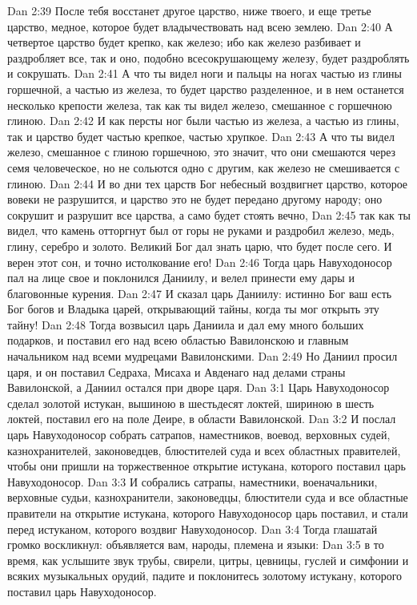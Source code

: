 Dan 2:39  После тебя восстанет другое царство, ниже твоего, и еще третье царство, медное, которое будет владычествовать над всею землею.
Dan 2:40  А четвертое царство будет крепко, как железо; ибо как железо разбивает и раздробляет все, так и оно, подобно всесокрушающему железу, будет раздроблять и сокрушать.
Dan 2:41  А что ты видел ноги и пальцы на ногах частью из глины горшечной, а частью из железа, то будет царство разделенное, и в нем останется несколько крепости железа, так как ты видел железо, смешанное с горшечною глиною.
Dan 2:42  И как персты ног были частью из железа, а частью из глины, так и царство будет частью крепкое, частью хрупкое.
Dan 2:43  А что ты видел железо, смешанное с глиною горшечною, это значит, что они смешаются через семя человеческое, но не сольются одно с другим, как железо не смешивается с глиною.
Dan 2:44  И во дни тех царств Бог небесный воздвигнет царство, которое вовеки не разрушится, и царство это не будет передано другому народу; оно сокрушит и разрушит все царства, а само будет стоять вечно,
Dan 2:45  так как ты видел, что камень отторгнут был от горы не руками и раздробил железо, медь, глину, серебро и золото. Великий Бог дал знать царю, что будет после сего. И верен этот сон, и точно истолкование его!
Dan 2:46  Тогда царь Навуходоносор пал на лице свое и поклонился Даниилу, и велел принести ему дары и благовонные курения.
Dan 2:47  И сказал царь Даниилу: истинно Бог ваш есть Бог богов и Владыка царей, открывающий тайны, когда ты мог открыть эту тайну!
Dan 2:48  Тогда возвысил царь Даниила и дал ему много больших подарков, и поставил его над всею областью Вавилонскою и главным начальником над всеми мудрецами Вавилонскими.
Dan 2:49  Но Даниил просил царя, и он поставил Седраха, Мисаха и Авденаго над делами страны Вавилонской, а Даниил остался при дворе царя.
Dan 3:1  Царь Навуходоносор сделал золотой истукан, вышиною в шестьдесят локтей, шириною в шесть локтей, поставил его на поле Деире, в области Вавилонской.
Dan 3:2  И послал царь Навуходоносор собрать сатрапов, наместников, воевод, верховных судей, казнохранителей, законоведцев, блюстителей суда и всех областных правителей, чтобы они пришли на торжественное открытие истукана, которого поставил царь Навуходоносор.
Dan 3:3  И собрались сатрапы, наместники, военачальники, верховные судьи, казнохранители, законоведцы, блюстители суда и все областные правители на открытие истукана, которого Навуходоносор царь поставил, и стали перед истуканом, которого воздвиг Навуходоносор.
Dan 3:4  Тогда глашатай громко воскликнул: объявляется вам, народы, племена и языки:
Dan 3:5  в то время, как услышите звук трубы, свирели, цитры, цевницы, гуслей и симфонии и всяких музыкальных орудий, падите и поклонитесь золотому истукану, которого поставил царь Навуходоносор.
